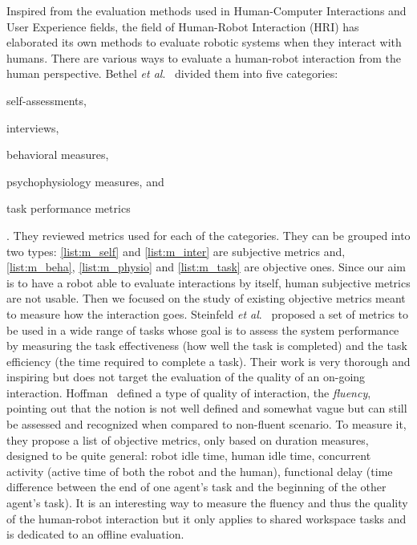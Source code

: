 \documentclass[a4paper,11pt,twoside]{StyleThese}
\begin{document}
Inspired from the evaluation methods used in Human-Computer Interactions and User Experience fields, the field of Human-Robot Interaction (HRI) has elaborated its own methods to evaluate robotic systems when they interact with humans. There are various ways to evaluate a human-robot interaction from the human perspective. Bethel \textit{et al}.~\cite{bethel_2010_review} divided them into five categories: \begin{inlineEnumerate}
	\item self-assessments,\label{list:m_self}
	\item interviews,\label{list:m_inter}
	\item behavioral measures,\label{list:m_beha}
	\item psychophysiology measures, and\label{list:m_physio}
	\item task performance metrics\label{list:m_task}
\end{inlineEnumerate}. They reviewed metrics used for each of the categories. They can be grouped into two types: \ref{list:m_self} and \ref{list:m_inter} are subjective metrics and, \ref{list:m_beha}, \ref{list:m_physio} and \ref{list:m_task} are objective ones. Since our aim is to have a robot able to evaluate interactions by itself, human subjective metrics are not usable. Then we focused on the study of existing objective metrics meant to measure how the interaction goes. Steinfeld \textit{et al}.~\cite{steinfeld_2006_common} proposed a set of metrics to be used in a wide range of tasks whose goal is to assess the system performance by measuring the task effectiveness (\ie how well the task is completed) and the task efficiency (\ie the time required to complete a task). Their work is very thorough and inspiring but does not target the evaluation of the quality of an on-going interaction. 
Hoffman~\cite{hoffman2019} defined a type of quality of interaction, the \textit{fluency}, pointing out that the notion is not well defined and somewhat vague but can still be assessed and recognized when compared to non-fluent scenario. To measure it, they propose a list of objective metrics, only based on duration measures, designed to be quite general: robot idle time, human idle time, concurrent activity (\ie active time of both the robot and the human), functional delay (\ie time difference between the end of one agent’s task and the beginning of the other agent’s task). It is an interesting way to measure the fluency and thus the quality of the human-robot interaction but it only applies to shared workspace tasks and is dedicated to an offline evaluation.
\end{document}

